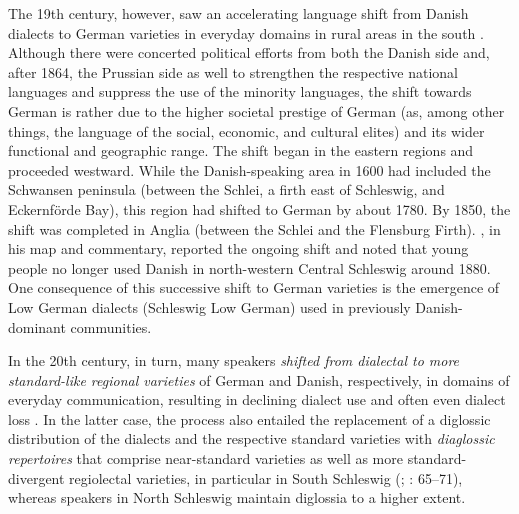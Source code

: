 \documentclass[output=paper]{langsci/langscibook}
\begin{document}
The 19th century, however, saw an accelerating language shift from Danish dialects to German varieties in everyday domains in rural areas in the south \citep[59]{Hoder.2019}. Although there were concerted political efforts from both the Danish side and, after 1864, the Prussian side as well to strengthen the respective national languages and suppress the use of the minority languages, the shift towards German is rather due to the higher societal prestige of German (as, among other things, the language of the social, economic, and cultural elites) and its wider functional and geographic range. The shift began in the eastern regions and proceeded westward. While the Danish-speaking area in 1600 had included the Schwansen peninsula (between the Schlei, a firth east of Schleswig, and Eckernförde Bay), this region had shifted to German by about 1780. By 1850, the shift was completed in Anglia (between the Schlei and the Flensburg Firth). \citep[3--6]{Wenker.2013}, in his map and commentary, reported the ongoing shift and noted that young people no longer used Danish in north-western Central Schleswig around 1880. One consequence of this successive shift to German varieties is the emergence of Low German dialects (Schleswig Low German) used in previously Danish-dominant communities.

In the 20th century, in turn, many speakers \textit{shifted from dialectal to more standard-like regional varieties} of German and Danish, respectively, in domains of everyday communication, resulting in declining dialect use and often even dialect loss \citep[62]{Hoder.2019}. In the latter case, the process also entailed the replacement of a diglossic distribution of the dialects and the respective standard varieties with \textit{diaglossic repertoires} \citep{Auer.2011} that comprise near-standard varieties as well as more standard-divergent regiolectal varieties, in particular in South Schleswig (\citealt{Hoder.2011}; \citeyear{Hoder.2019}: 65--71), whereas speakers in North Schleswig maintain diglossia to a higher extent.
\end{document}
